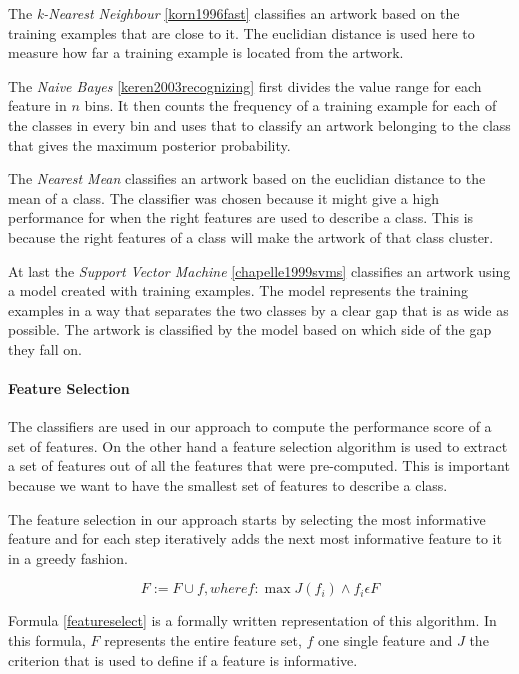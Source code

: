 The \textit{k-Nearest Neighbour} \ref{korn1996fast} classifies an artwork based on the training examples that are close to it.
The euclidian distance is used here to measure how far a training example is located from the artwork.

The \textit{Naive Bayes} \ref{keren2003recognizing} first divides the value range for each feature in $n$ bins.
It then counts the frequency of a training example for each of the classes in every bin and uses that to classify an artwork belonging to the class that gives the maximum posterior probability.

The \textit{Nearest Mean} classifies an artwork based on the euclidian distance to the mean of a class.
The classifier was chosen because it might give a high performance for when the right features are used to describe a class.
This is because the right features of a class will make the artwork of that class cluster.

At last the \textit{Support Vector Machine} \ref{chapelle1999svms} classifies an artwork using a model created with training examples.
The model represents the training examples in a way that separates the two classes by a clear gap that is as wide as possible.
The artwork is classified by the model based on which side of the gap they fall on.

\paragraph{Feature Selection}
The classifiers are used in our approach to compute the performance score of a set of features.
On the other hand a feature selection algorithm is used to extract a set of features out of all the features that were pre-computed.
This is important because we want to have the smallest set of features to describe a class.

The feature selection in our approach starts by selecting the most informative feature and for each step iteratively adds the next most informative feature to it in a greedy fashion.

\begin{equation}
\label{featureselect}
F := F \cup f, where f: \max{J(f_i)} \wedge f_i \epsilon F
\end{equation}

Formula \ref{featureselect} is a formally written representation of this algorithm.
In this formula, $F$ represents the entire feature set, $f$ one single feature and $J$ the criterion that is used to define if a feature is informative.

